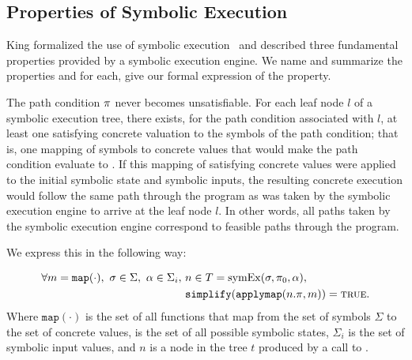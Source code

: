 
\subsection{Properties of Symbolic Execution}
King formalized the use of symbolic execution~\cite{king1976symbolic} and
described three fundamental
properties provided by a symbolic execution engine. We name and summarize the properties
and for each, give our formal expression of the property.
\setcounter{property}{0}
\renewcommand{\theproperty}{K.\arabic{property}}
\begin{property}
  \label{prop:kingsound}
  The path condition $\pi$ never becomes unsatisfiable. For each
  leaf node $l$ of a symbolic execution tree, there exists, for the path condition
  associated with $l$, at
  least one satisfying concrete valuation to the symbols of the path
  condition; that is, one mapping of symbols to concrete values that
  would make the path condition evaluate to \texttrue. If this mapping of satisfying concrete values were
  applied to the initial symbolic state and symbolic inputs, the resulting
  concrete execution would follow the same path through the program as was taken
  by the symbolic execution engine to arrive at the leaf node $l$. In other
  words, all paths taken by the symbolic execution engine correspond to feasible
  paths through the program.
  
  We express this in the following way: 
  

  \begin{align*}
    \forall m = \mathtt{map(\cdot)},~\sigma \in \Sigma,~\alpha \in \Sigma_i,~& n \in T = \mathrm{symEx}(\sigma,\pi_0,\alpha), \\
    & \mathtt{simplify}(\mathtt{applymap}(n.\pi,m)) = \mathtt{\textsc{true}}.
  \end{align*}
  Where $\mathtt{map(\cdot)}$ is the set of all functions that map from the set
  of symbols $\Sigma$ to the set of concrete values, \symstates{} is the set of all
  possible symbolic states, $\Sigma_i$ is the set of symbolic input values, and $n$ is a node in the tree $t$ produced by a call
  to \symexecution.
\end{property}


